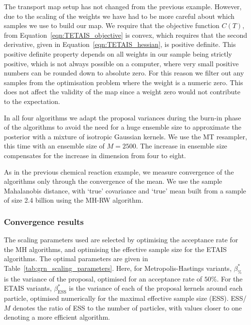 \documentclass[final]{siamltex}
\newcommand{\edit}[1]{{\color{red} #1}}
\begin{document}
The transport map setup has not changed from the previous
example. However, due to the scaling of the weights we have had to be
more careful about which samples we use to build our map. We require
that the objective function $C(T)$, from
Equation~\eqref{eqn:TETAIS_objective} is convex, which requires that
the second derivative, given in Equation~\eqref{eqn:TETAIS_hessian},
is positive definite. This positive definite property depends on all
weights in our sample being strictly positive, which is not always
possible on a computer, where very small positive numbers can be
rounded down to absolute zero. For this reason we filter out any samples from the optimisation problem where the weight is a numeric zero. This does not affect the validity of the map since a weight zero would not contribute to the expectation.

In all \edit{four} algorithms we adapt the proposal variances during the
burn-in phase of the algorithms to avoid the need for a huge ensemble size to approximate the posterior with a mixture of isotropic Gaussian kernels.
We use the MT resampler, this time with an ensemble size of $M=2500$. The increase in ensemble size compensates for the increase in dimension from four to eight.

As in the previous chemical reaction example, we measure convergence of the algorithms only through the convergence of the mean. We use the sample Mahalanobis distance, with `true' covariance and `true' mean built from a sample of size 2.4 billion using the MH-RW algorithm.

\subsubsection{Convergence results}

The scaling parameters used are selected by optimising the acceptance
rate for the MH algorithms, and optimising the effective sample size
for the ETAIS algorithms. The optimal parameters are given in
Table~\ref{tab:grn_scaling_parameters}. Here, for Metropolis-Hastings
variants, $\beta_{\%}^*$ is the variance of the proposal, optimised
for an acceptance rate of $50\%$. For the ETAIS variants,
$\beta_{\text{ESS}}^*$ is the variance of each of the proposal kernels
around each particle, optimised numerically for the maximal effective
sample size (ESS). ESS/$M$ denotes the ratio of ESS to the number of
particles, with values closer to one denoting a more efficient algorithm.
\end{document}
